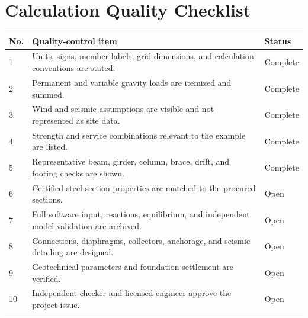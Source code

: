 \section{Calculation Quality Checklist}

\begin{longtable}{@{}p{8mm}p{104mm}p{26mm}@{}}
  \toprule
  \textbf{No.} & \textbf{Quality-control item} & \textbf{Status} \\
  \midrule
  \endhead
  1 & Units, signs, member labels, grid dimensions, and calculation conventions are
      stated. & Complete \\
  2 & Permanent and variable gravity loads are itemized and summed. & Complete \\
  3 & Wind and seismic assumptions are visible and not represented as site data. & Complete \\
  4 & Strength and service combinations relevant to the example are listed. & Complete \\
  5 & Representative beam, girder, column, brace, drift, and footing checks are shown. & Complete \\
  6 & Certified steel section properties are matched to the procured sections. & Open \\
  7 & Full software input, reactions, equilibrium, and independent model validation are
      archived. & Open \\
  8 & Connections, diaphragms, collectors, anchorage, and seismic detailing are designed. & Open \\
  9 & Geotechnical parameters and foundation settlement are verified. & Open \\
  10 & Independent checker and licensed engineer approve the project issue. & Open \\
  \bottomrule
\end{longtable}

\appendix
